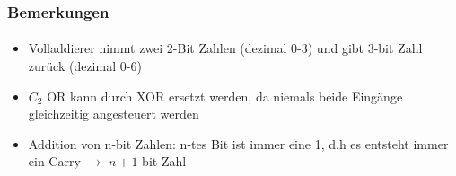 \begin{frame}
    \frametitle{}
    \framesubtitle{}
    \begin{center}
    \end{center}
\end{frame}
\begin{frame}
    \frametitle{Bemerkungen}
    \framesubtitle{}
    \begin{block}{}
        \begin{itemize}
            \item Volladdierer nimmt zwei 2-Bit Zahlen (dezimal 0-3) und gibt
            3-bit Zahl zurück (dezimal 0-6)
            \item $C_2$ OR kann durch XOR ersetzt werden, da niemals beide
            Eingänge gleichzeitig angesteuert werden
            \item Addition von n-bit Zahlen: n-tes Bit ist immer eine 1, d.h
            es entsteht immer ein Carry $\rightarrow$ $n+1$-bit Zahl
        \end{itemize}
    \end{block}

    
\end{frame}
